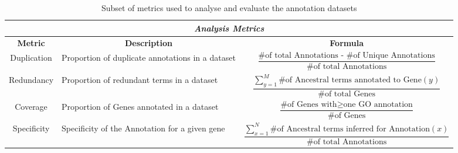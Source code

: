 \begin{landscape}
\begin{table}[h]
  \centering
  \small
  \caption{Subset of metrics used to analyse and evaluate the annotation datasets}
  \label{tbl:metrics}
  \begin{tabularx}{\linewidth}{|cXc|}
    \hline
    \multicolumn{3}{|c|}{\textbf{\emph{Analysis Metrics}}} \\
    \hline
    \textbf{Metric} & \multicolumn{1}{c}{\textbf{Description}} & \multicolumn{1}{c|}{\textbf{Formula}} \\
    \hline
    Duplication & Proportion of duplicate annotations in a dataset &
    \begin{minipage}{4.2in}
      \centering
      \begin{equation*}
        \frac{
        \text{\# of total Annotations - \# of Unique Annotations}
        }
        {
          \text{\# of total Annotations}
        }
      \end{equation*}
    \end{minipage}
    \\
    \hline
     Redundancy & Proportion of redundant terms in a dataset &
    \begin{minipage}{4.2in}
      \begin{equation*}
        \frac{
        \sum_{y=1}^{M}  \text{\# of Ancestral terms annotated to Gene}(y)
        }
        {
          \text{\# of total Genes}
        }
      \end{equation*}
    \end{minipage}
    \\
    \hline
    Coverage & Proportion of Genes annotated in a dataset &
    \begin{minipage}{4.2in}
      \begin{equation*}
        \frac{
          \text{\# of Genes with} \geq \text{one GO annotation}
        }
        {
          \text{\# of Genes}
        }
      \end{equation*}
    \end{minipage}
    \\
    \hline
    Specificity & Specificity of the Annotation for a given gene &
    \begin{minipage}{4.2in}
      \begin{equation*}
        \frac{
        \sum_{x=1}^{N}  \text{\# of Ancestral terms inferred for Annotation}(x)
        }
        {
          \text{\# of total Annotations}
        }
      \end{equation*}

\end{minipage}
\end{tabularx}
\end{table}
\end{landscape}
